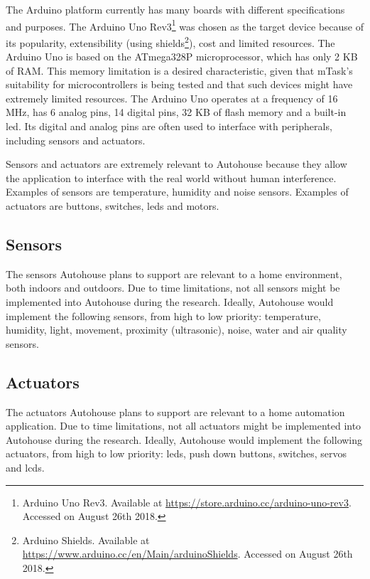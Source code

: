 The Arduino platform currently has many boards with different specifications and purposes. The Arduino Uno Rev3\footnote{Arduino Uno Rev3. Available at \url{https://store.arduino.cc/arduino-uno-rev3}. Accessed on August 26th 2018.} was chosen as the target device because of its popularity, extensibility (using shields\footnote{Arduino Shields. Available at \url{https://www.arduino.cc/en/Main/arduinoShields}. Accessed on August 26th 2018.}), cost and limited resources. The Arduino Uno is based on the ATmega328P microprocessor, which has only 2 KB of RAM. This memory limitation is a desired characteristic, given that mTask's suitability for microcontrollers is being tested and that such devices might have extremely limited resources. The Arduino Uno operates at a frequency of 16 MHz, has 6 analog pins, 14 digital pins, 32 KB of flash memory and a built-in \acs{led}. Its digital and analog pins are often used to interface with peripherals, including sensors and actuators. 



Sensors and actuators are extremely relevant to Autohouse because they allow the application to interface with the real world without human interference. Examples of sensors are temperature, humidity and noise sensors. Examples of actuators are buttons, switches, \acsp{led} and motors.

\subsection{Sensors}

The sensors Autohouse plans to support are relevant to a home environment, both indoors and outdoors. Due to time limitations, not all sensors might be implemented into Autohouse during the research. Ideally, Autohouse would implement the following sensors, from high to low priority: temperature, humidity, light, movement, proximity (ultrasonic), noise, water and air quality sensors. 

\subsection{Actuators}

The actuators Autohouse plans to support are relevant to a home automation application. Due to time limitations, not all actuators might be implemented into Autohouse during the research. Ideally, Autohouse would implement the following actuators, from high to low priority: \acsp{led}, push down buttons, switches, servos and \acsp{lcd}.

